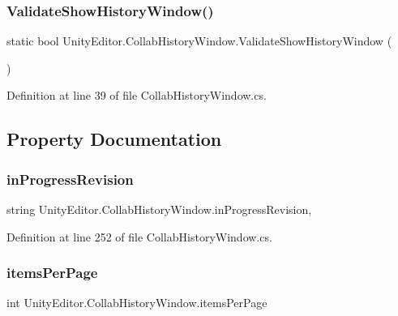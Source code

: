 \subsubsection{\texorpdfstring{ValidateShowHistoryWindow()}{ValidateShowHistoryWindow()}}
{\footnotesize\ttfamily static bool Unity\+Editor.\+Collab\+History\+Window.\+Validate\+Show\+History\+Window (\begin{DoxyParamCaption}{ }\end{DoxyParamCaption})\hspace{0.3cm}{\ttfamily [static]}}



Definition at line 39 of file Collab\+History\+Window.\+cs.



\subsection{Property Documentation}
\mbox{\label{class_unity_editor_1_1_collab_history_window_af4770e386e2756a72cc18fa123f9a84d}} 
\subsubsection{\texorpdfstring{inProgressRevision}{inProgressRevision}}
{\footnotesize\ttfamily string Unity\+Editor.\+Collab\+History\+Window.\+in\+Progress\+Revision\hspace{0.3cm}{\ttfamily [get]}, {\ttfamily [set]}}



Definition at line 252 of file Collab\+History\+Window.\+cs.

\mbox{\label{class_unity_editor_1_1_collab_history_window_a745e77e85001e4e18eb4ffbeea4f4be9}} 
\subsubsection{\texorpdfstring{itemsPerPage}{itemsPerPage}}
{\footnotesize\ttfamily int Unity\+Editor.\+Collab\+History\+Window.\+items\+Per\+Page\hspace{0.3cm}{\ttfamily [set]}}



